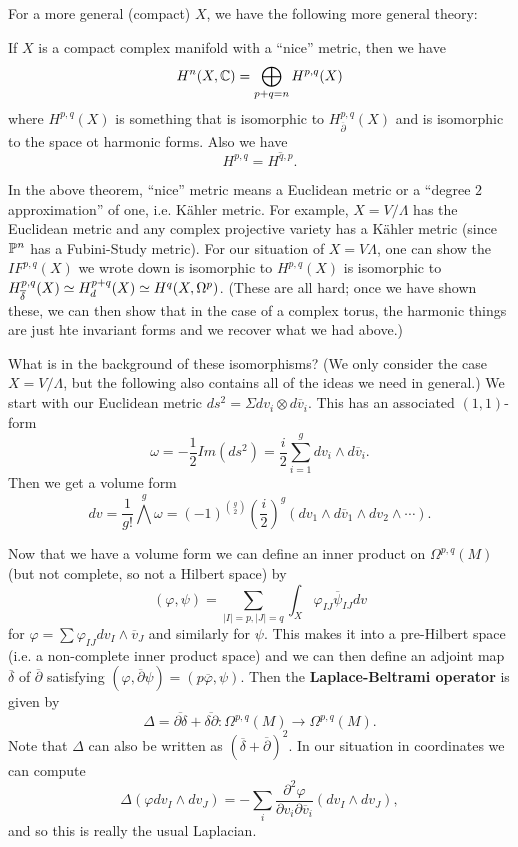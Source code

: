  
For a more general (compact) $X$, we have the following more general theory: 
\begin{theorem}
	If $X$ is a compact complex manifold with a ``nice'' metric, then we have 
	$$H^n(X , {\mathbb C})=\bigoplus_{p+q=n}H^{p,q}(X)$$ 
where $H^{p,q}(X)$ is something that is isomorphic to $H^{p,q}_{\overline{\partial}}(X)$ and is isomorphic to the space ot harmonic forms. Also we have	
$$H^{p,q}=\overline{H^{q,p}}.$$
\end{theorem}


In the above theorem, ``nice'' metric means a Euclidean metric or a ``degree $2$ approximation'' of one, i.e. K\"{a}hler metric. For example, $X=V/\Lambda$ has the Euclidean metric and any complex projective variety has a K\"{a}hler metric (since ${\mathbb P}^n$ has a Fubini-Study metric). For our situation of $X=V\Lambda$, one can show the $IF^{p,q}(X)$ we wrote down is isomorphic to $H^{p,q}(X)$ is isomorphic to  
$H^{p,q}_{\overline{\delta}}(X)\simeq H^{p+q}_d(X)\simeq H^q(X,\Omega^p)$. (These are all hard; once we have shown these, we can then show that in the case of a complex torus, the harmonic things are just hte invariant forms and we recover what we had above.)

What is in the background of these isomorphisms? (We only consider the case $X=V/\Lambda$, but the following also contains all of the ideas we need in general.) We start with our Euclidean metric $ds^2=\Sigma dv_i\otimes d\overline{v}_i$. This has an associated $(1,1)$-form 
$$\omega=-\frac{1}{2}Im(ds^2)=\frac{i}{2}\sum_{i=1}^g dv_i\wedge d\overline{v}_i.$$
Then we get a volume form 
$$dv=\frac{1}{g!}\bigwedge^g \omega = (-1)^{\binom{g}{2}}\left(\frac{i}{2}\right)^g(dv_1\wedge d\overline{v}_1\wedge dv_2\wedge \cdots).$$

Now that we have a volume form we can define an inner product on $\Omega^{p,q}(M)$ (but not complete, so not a Hilbert space) by 
$$(\varphi,\psi)=\sum_{|I|=p,|J|=q} \int_X \varphi_{IJ}\overline{\psi}_{IJ}dv$$
for $\varphi=\sum \varphi_{IJ}dv_I\wedge \overline{v}_J$ and similarly for $\psi$. 
This makes it into a pre-Hilbert space (i.e. a non-complete inner product space) and we can then define an adjoint map $\overline{\delta}$ of $\overline{\partial}$ satisfying $(\varphi,\overline{\partial}\psi)=(p\overline{\varphi},\psi)$. Then the \textbf{Laplace-Beltrami operator} is given by
$$\Delta=\overline{\partial\delta}+\overline{\delta\partial}:\Omega^{p,q}(M)\to \Omega^{p,q}(M).$$
Note that $\Delta$ can also be written as $(\overline{\delta}+\overline{\partial})^2$.
In our situation in coordinates we can compute 
$$\Delta(\varphi dv_I\wedge dv_J)=-\sum_i \frac{\partial^2 \varphi}{\partial v_i\partial \overline{v}_i}(dv_I\wedge dv_J),$$
and so this is really the usual Laplacian.

